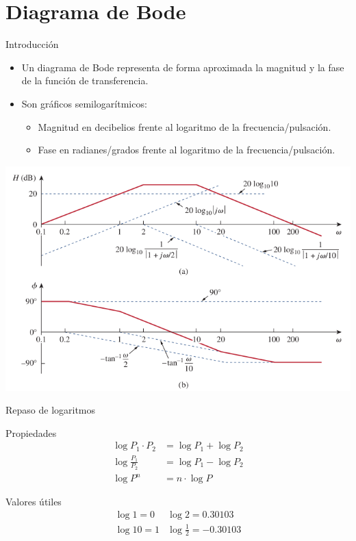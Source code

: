 \documentclass[xcolor={usenames,svgnames,dvipsnames}]{beamer}
\begin{document}
\section{Diagrama de Bode}
\label{sec:orged5c197}

\begin{frame}[label={sec:org42a511a}]{Introducción}
\begin{itemize}
\item Un diagrama de Bode representa de forma \alert{aproximada} la magnitud y la fase de la función de transferencia.
\item Son \alert{gráficos semilogarítmicos}:
\begin{itemize}
\item Magnitud en \alert{decibelios} frente al logaritmo de la frecuencia/pulsación.
\item Fase en radianes/grados frente al logaritmo de la frecuencia/pulsación.
\end{itemize}
\end{itemize}
\begin{center}
\includegraphics[height=0.5\textheight]{figs/Bode.pdf}
\end{center}
\end{frame}

\begin{frame}[label={sec:orgb59b4e6}]{Repaso de logaritmos}
\begin{block}{Propiedades}
\begin{align*}
  \log {P_1 \cdot P_2} &= \log P_1 + \log P_2\\
  \log \frac{P_1}{P_2} &= \log P_1 - \log P_2\\
  \log P^n &= n \cdot \log P
\end{align*}
\end{block}

\begin{block}{Valores útiles}
\[
\begin{array}{ll}
  \log 1 = 0 & \log 2 = 0.30103\\
  \log 10 = 1 & \log \frac{1}{2} = -0.30103
\end{array}
\]
\end{block}
\end{frame}
\end{document}
